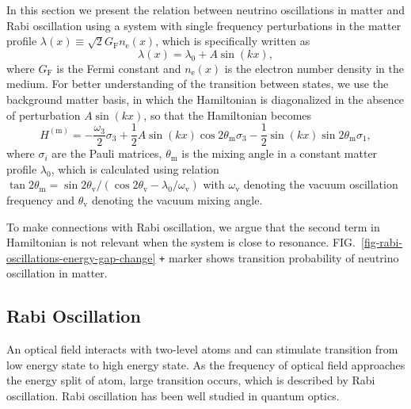 \documentclass[%
preprint,
 amsmath,amssymb,
 aps,
]{revtex4-1}
\begin{document}
In this section we present the relation between neutrino oscillations in matter and Rabi oscillation using a system with single frequency perturbations in the matter profile $\lambda(x)\equiv\sqrt{2}G_{\mathrm F} n_{\mathrm e}(x)$, which is specifically written as
\begin{equation}
    \lambda(x) = \lambda_0 + A \sin (k x) ,
\end{equation}
where $G_{\mathrm F}$ is the Fermi constant and $n_{\mathrm e}(x)$ is the electron number density in the medium. For better understanding of the transition between states, we use the background matter basis, in which the Hamiltonian is diagonalized in the absence of perturbation $A\sin(kx)$, so that the Hamiltonian becomes
\begin{equation}
    H^{(\mathrm{m})} = -\frac{\omega_3}{2} \sigma_3 + \frac{1}{2} A\sin (kx) \cos 2\theta_{\mathrm m} \sigma_3 -\frac{1}{2} \sin(kx) \sin 2\theta_{\mathrm m} \sigma_1,\label{neutrino-matter-single-frequency-hamiltonian}
\end{equation}
where $\sigma_i$ are the Pauli matrices, $\theta_{\mathrm m}$ is the mixing angle in a constant matter profile $\lambda_0$, which is calculated using relation $\tan 2\theta_{\mathrm{m}}=\sin 2\theta_{\mathrm v}/\left( \cos 2\theta_{\mathrm v} - \lambda_0/\omega_{\mathrm v} \right)$ with $\omega_{\mathrm v}$ denoting the vacuum oscillation frequency and $\theta_{\mathrm v}$ denoting the vacuum mixing angle.

To make connections with Rabi oscillation, we argue that the second term in Hamiltonian is not relevant when the system is close to resonance. FIG.~\ref{fig-rabi-oscillations-energy-gap-change} \verb|+| marker shows transition probability of neutrino oscillation in matter.





\subsection{Rabi Oscillation}


An optical field interacts with two-level atoms and can stimulate transition from low energy state to high energy state. As the frequency of optical field approaches the energy split of atom, large transition occurs, which is described by Rabi oscillation. Rabi oscillation has been well studied in quantum optics.\cite{Boyd2008} 
\end{document}
